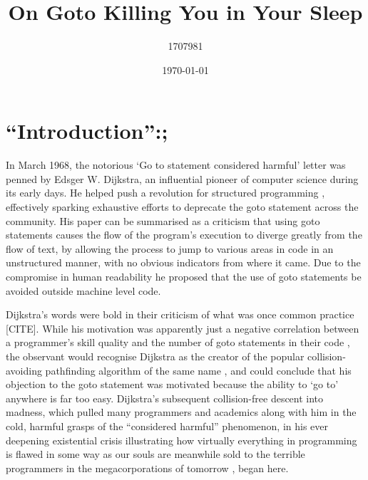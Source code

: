 \documentclass{journal}
\title{On Goto Killing You in Your Sleep}
\author{1707981}
\date{\today}
\begin{document}
\maketitle




\section{``Introduction'':;}
In March 1968, the notorious `Go to statement considered harmful' \cite{goto} letter was penned by Edsger W. Dijkstra, an influential pioneer of computer science during its early days. He helped push a revolution for structured programming \cite{structured}, effectively sparking exhaustive efforts to deprecate the goto statement \cite{revolution1, againstgoto} across the community. His paper can be summarised as a criticism that using goto statements causes the flow of the program's execution to diverge greatly from the flow of text, by allowing the process to jump to various areas in code in an unstructured manner, with no obvious indicators from where it came. Due to the compromise in human readability he proposed that the use of goto statements be avoided outside machine level code.

Dijkstra's words were bold in their criticism of what was once common practice [CITE]. While his motivation was apparently just a negative correlation between a programmer's skill quality and the number of goto statements in their code \cite{goto, humanprogramming}, the observant would recognise Dijkstra as the creator of the popular collision-avoiding pathfinding algorithm of the same name \cite{pathfinding}, and could conclude that his objection to the goto statement was motivated because the ability to `go to' anywhere is far too easy. Dijkstra's subsequent collision-free descent into madness, which pulled many programmers and academics along with him in the cold, harmful grasps of the ``considered harmful'' phenomenon, in his ever deepening existential crisis illustrating how virtually everything in programming is flawed in some way as our souls are meanwhile sold to the terrible programmers in the megacorporations of tomorrow \cite{truths}, began here.
\end{document}
